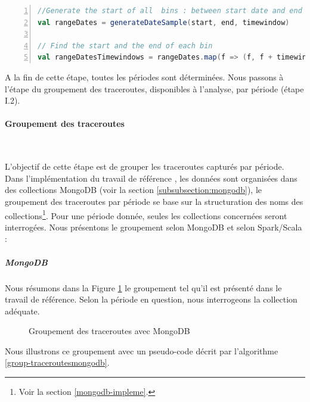 \begin{lstlisting}[language=scala,firstnumber=1, caption={Etape FindBins (I.1)},label={lst:findbins}, basicstyle = \small,escapechar=|,numbers=left,
stepnumber=1]
//Generate the start of all  bins : between start date and end date espaced by the timewindow
val rangeDates = generateDateSample(start, end, timewindow)

// Find the start and the end of each bin
val rangeDatesTimewindows = rangeDates.map(f => (f, f + timewindow))
\end{lstlisting}

A la fin de cette étape, toutes les périodes sont déterminées. Nous passons à l'étape du groupement des traceroutes, disponibles à l'analyse, par période (étape I.2).

\paragraph{Groupement des traceroutes}~

L'objectif de cette étape est de grouper les traceroutes capturés par période. 
Dans l'implémentation du travail de référence \cite{DBLP:journals/corr/FontugneAPB16}, les données sont organisées dans des collections MongoDB (voir la section \ref{subsubsection:mongodb}), le groupement des traceroutes par période se base sur la structuration des noms des collections\footnote{Voir la section \ref{mongodb-impleme}.}. Pour une période donnée, seules les collections concernées  seront interrogées.  Nous présentons le groupement selon MongoDB et selon Spark/Scala :
 

\subparagraph{MongoDB}
Nous résumons dans la Figure \ref{fig:read-data-from-mongodb} le groupement  tel qu'il est présenté dans le travail de référence.  
Selon la période en question, nous interrogeons la collection  adéquate.

\begin{figure}[h]
	\centering
	
	\captionsetup{justification=centering}
	\resizebox{10cm}{6cm}{
	
}
	\caption{Groupement des traceroutes avec MongoDB}
	\label{fig:read-data-from-mongodb}
\end{figure}

Nous illustrons ce groupement avec un pseudo-code décrit par l'algorithme \ref{group-traceroutesmongodb}.


